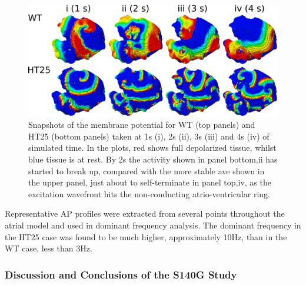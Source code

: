 \begin{figure}
\includegraphics{figures/atrium/iks/3D_Fig}
\caption[Snapshots of membrane potential over the whole atrium with S140G
mutation]{
\label{atrium:iks:threed}
Snapshots of the membrane potential for WT (top panels) and HT25 (bottom
panels) taken at \unit{1}{s} (i), \unit{2}{s} (ii), \unit{3}{s} (iii) and
\unit{4}{s} (iv) of simulated time.
In the plots, red shows full depolarized tissue, whilst blue tissue is at rest.
By \unit{2}{s} the activity shown in panel bottom,ii has started to break up, compared with
the more stable ave shown in the upper panel, just about to self-terminate in
panel top,iv, as the excitation wavefront hits the non-conducting atrio-ventricular
ring.
}
\end{figure}

Representative AP profiles were extracted from several points throughout the
atrial model and used in dominant frequency analysis.
The dominant frequency in the HT25 case was found to be much higher,
approximately \unit{10}{Hz}, than in the WT case, less than \unit{3}{Hz}.

\subsubsection{Discussion and Conclusions of the S140G Study}

